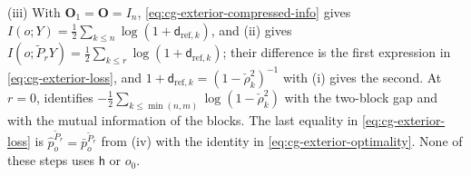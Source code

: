 (iii) With \(\mathbf O_1=\mathbf O=I_n\), \eqref{eq:cg-exterior-compressed-info} gives
\(I(o;Y)=\frac12\sum_{k\leq n}\log(1+\mathsf d_{\mathrm{ref},k})\), and (ii) gives
\(I(o;\widetilde P_rY)=\frac12\sum_{k\leq r}\log(1+\mathsf d_{\mathrm{ref},k})\); their
difference is the first expression in \eqref{eq:cg-exterior-loss}, and
\(1+\mathsf d_{\mathrm{ref},k}=(1-\check\rho_k^2)^{-1}\) with (i) gives the second.
At \(r=0\),  identifies
\(-\frac12\sum_{k\leq\min(n,m)}\log(1-\check\rho_k^2)\) with the two-block gap and
with the mutual information of the blocks. The last equality in
\eqref{eq:cg-exterior-loss} is \(\widehat p^{\widetilde P_r}_o=\bar p^{\widetilde P_r}_o\)
from (iv) with the identity in \eqref{eq:cg-exterior-optimality}. None of these
steps uses \(\mathsf h\) or \(o_0\).

